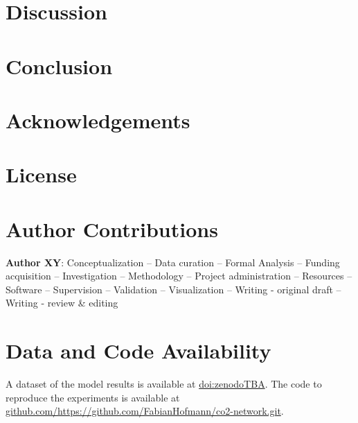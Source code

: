 \documentclass[5p]{elsarticle}
\begin{document}
\section{Discussion}
\label{sec:discussion}



\section{Conclusion}
\label{sec:conclusion}



\section*{Acknowledgements}
\label{sec:acknowledgements}


\section*{License}
\label{sec:license}

\section*{Author Contributions}
\label{sec:author-contributions}

\textbf{Author XY}:
Conceptualization --
Data curation --
Formal Analysis --
Funding acquisition --
Investigation --
Methodology --
Project administration --
Resources --
Software --
Supervision --
Validation --
Visualization --
Writing - original draft --
Writing - review \& editing


\section*{Data and Code Availability}
\label{sec:data-and-code-availability}

A dataset of the model results is available at \href{zenodoTBA}{doi:zenodoTBA}.
The code to reproduce the experiments is available at
\href{https://github.com/https://github.com/FabianHofmann/co2-network.git}{github.com/https://github.com/FabianHofmann/co2-network.git}.



\renewcommand{\ttdefault}{\sfdefault}

\end{document}
